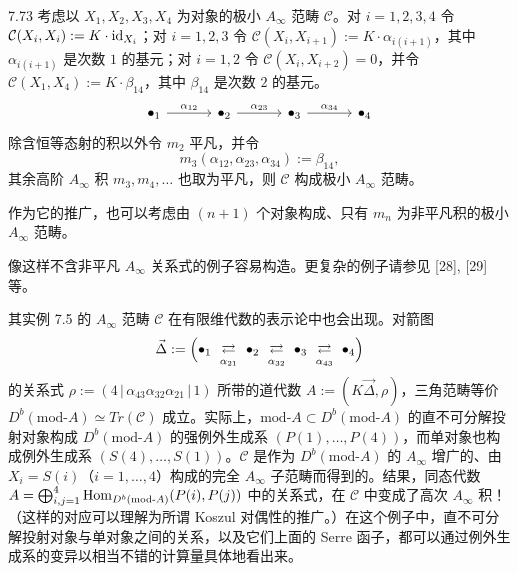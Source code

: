 \begin{example}{7.73}
考虑以 $X_{1},X_{2},X_{3},X_{4}$ 为对象的极小 $A_\infty$ 范畴 $\mathcal C$。对 $i=1,2,3,4$ 令 $\mathcal C(X_{i},X_{i}):=K\cdot\mathrm{id}_{X_{i}}$；对 $i=1,2,3$ 令 $\mathcal C(X_{i},X_{i+1}):=K\cdot\alpha_{i(i+1)}$，其中 $\alpha_{i(i+1)}$ 是次数 $1$ 的基元；对 $i=1,2$ 令 $\mathcal C(X_{i},X_{i+2})=0$，并令 $\mathcal C(X_{1},X_{4}):=K\cdot\beta_{14}$，其中 $\beta_{14}$ 是次数 $2$ 的基元。
\[
\begin{tikzcd}[row sep=0.6em, column sep=3.2em]
  \bullet_{1} \arrow[r,"\alpha_{12}"] & \bullet_{2} \arrow[r,"\alpha_{23}"] & \bullet_{3} \arrow[r,"\alpha_{34}"] & \bullet_{4}
\end{tikzcd}
\]
除含恒等态射的积以外令 $m_{2}$ 平凡，并令
\[
  m_{3}(\alpha_{12},\alpha_{23},\alpha_{34}):=\beta_{14},
\]
其余高阶 $A_\infty$ 积 $m_{3},m_{4},\dots$ 也取为平凡，则 $\mathcal C$ 构成极小 $A_\infty$ 范畴。
\end{example}

作为它的推广，也可以考虑由 $(n+1)$ 个对象构成、只有 $m_{n}$ 为非平凡积的极小 $A_\infty$ 范畴。

像这样不含非平凡 $A_\infty$ 关系式的例子容易构造。更复杂的例子请参见 [28], [29] 等。

其实例 7.5 的 $A_\infty$ 范畴 $\mathcal C$ 在有限维代数的表示论中也会出现。对箭图
\[
  \vec\Delta:=\Bigl(\bullet_{1}\ \underset{\alpha_{21}}{\overset{}{\rightleftarrows}}\ \bullet_{2}\ \underset{\alpha_{32}}{\overset{}{\rightleftarrows}}\ \bullet_{3}\ \underset{\alpha_{43}}{\overset{}{\rightleftarrows}}\ \bullet_{4}\Bigr)
\]
的关系式 $\rho:=(4\,|\,\alpha_{43}\alpha_{32}\alpha_{21}\,|\,1)$ 所带的道代数 $A:=(K\vec\Delta,\rho)$，三角范畴等价 $D^{b}(\mathrm{mod}\text{-}A)\simeq Tr(\mathcal C)$ 成立。实际上，$\mathrm{mod}\text{-}A\subset D^{b}(\mathrm{mod}\text{-}A)$ 的直不可分解投射对象构成 $D^{b}(\mathrm{mod}\text{-}A)$ 的强例外生成系 $(P(1),\dots,P(4))$，而单对象也构成例外生成系 $(S(4),\dots,S(1))$。$\mathcal C$ 是作为 $D^{b}(\mathrm{mod}\text{-}A)$ 的 $A_\infty$ 增广的、由 $X_{i}=S(i)$（$i=1,\dots,4$）构成的完全 $A_\infty$ 子范畴而得到的。结果，同态代数 $A=\bigoplus_{i,j=1}^{4}\operatorname{Hom}_{D^{b}(\mathrm{mod}\text{-}A)}(P(i),P(j))$ 中的关系式，在 $\mathcal C$ 中变成了高次 $A_\infty$ 积！（这样的对应可以理解为所谓 Koszul 对偶性的推广。）在这个例子中，直不可分解投射对象与单对象之间的关系，以及它们上面的 Serre 函子，都可以通过例外生成系的变异以相当不错的计算量具体地看出来。



